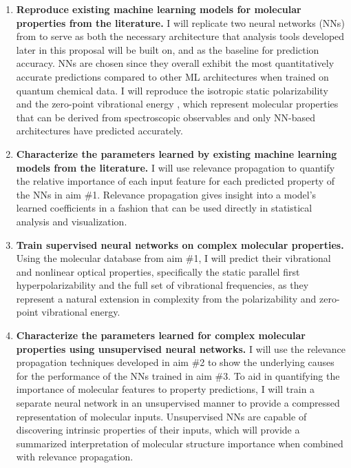 \documentclass[12pt]{article}
\begin{document}
\begin{enumerate}
\item \textbf{Reproduce existing machine learning models for molecular properties from the literature.} I will replicate two neural networks (NNs) from \parencite{2017arXiv170205532F} to serve as both the necessary architecture that analysis tools developed later in this proposal will be built on, and as the baseline for prediction accuracy. NNs are chosen since they overall exhibit the most quantitatively accurate predictions compared to other ML architectures when trained on quantum chemical data. I will reproduce the isotropic static polarizability \cite{POC:POC407} and the zero-point vibrational energy \cite{doi:10.1063/1.2436891}, which represent molecular properties that can be derived from spectroscopic observables and only NN-based architectures have predicted accurately.

\item \textbf{Characterize the parameters learned by existing machine learning models from the literature.} I will use relevance propagation \cite{10.1371/journal.pone.0130140,Binder2016,JMLR:v17:15-618} to quantify the relative importance of each input feature for each predicted property of the NNs in aim \#1. Relevance propagation gives insight into a model's learned coefficients in a fashion that can be used directly in statistical analysis and visualization.

\item \textbf{Train supervised neural networks on complex molecular properties.} Using the molecular database from aim \#1, I will predict their vibrational and nonlinear optical properties, specifically the static parallel first hyperpolarizability\cite{doi:10.1063/1.3134744} and the full set of vibrational frequencies, as they represent a natural extension in complexity from the polarizability and zero-point vibrational energy.

\item \textbf{Characterize the parameters learned for complex molecular properties using unsupervised neural networks.} I will use the relevance propagation techniques developed in aim \#2 to show the underlying causes for the performance of the NNs trained in aim \#3. To aid in quantifying the importance of molecular features to property predictions, I will train a separate neural network in an unsupervised manner to provide a compressed representation of molecular inputs. Unsupervised NNs are capable of discovering intrinsic properties of their inputs\cite{VincentPLarochelleH2008}, which will provide a summarized interpretation of molecular structure importance when combined with relevance propagation.
\end{enumerate}
\end{document}
